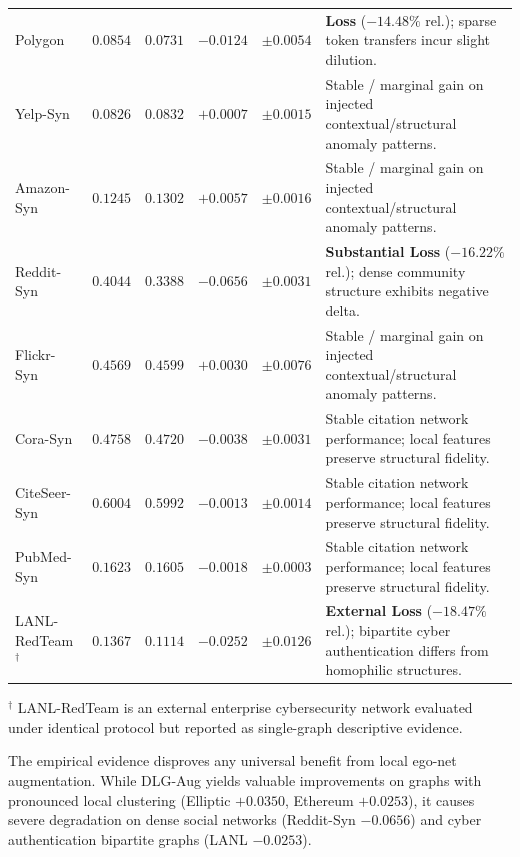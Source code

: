 \documentclass[applsci,article,submit,moreauthors,pdftex]{Definitions/mdpi}
\begin{document}
\begin{table}[htbp]
\begin{tabularx}{\textwidth}{lrrrr>{\raggedright\arraybackslash}X}
Polygon & $0.0854$ & $0.0731$ & $-0.0124$ & $\pm 0.0054$ & \textbf{Loss} ($-14.48\%$ rel.); sparse token transfers incur slight dilution. \\
Yelp-Syn & $0.0826$ & $0.0832$ & $+0.0007$ & $\pm 0.0015$ & Stable / marginal gain on injected contextual/structural anomaly patterns. \\
Amazon-Syn & $0.1245$ & $0.1302$ & $+0.0057$ & $\pm 0.0016$ & Stable / marginal gain on injected contextual/structural anomaly patterns. \\
Reddit-Syn & $0.4044$ & $0.3388$ & $\mathbf{-0.0656}$ & $\pm 0.0031$ & \textbf{Substantial Loss} ($-16.22\%$ rel.); dense community structure exhibits negative delta. \\
Flickr-Syn & $0.4569$ & $0.4599$ & $+0.0030$ & $\pm 0.0076$ & Stable / marginal gain on injected contextual/structural anomaly patterns. \\
Cora-Syn & $0.4758$ & $0.4720$ & $-0.0038$ & $\pm 0.0031$ & Stable citation network performance; local features preserve structural fidelity. \\
CiteSeer-Syn & $0.6004$ & $0.5992$ & $-0.0013$ & $\pm 0.0014$ & Stable citation network performance; local features preserve structural fidelity. \\
PubMed-Syn & $0.1623$ & $0.1605$ & $-0.0018$ & $\pm 0.0003$ & Stable citation network performance; local features preserve structural fidelity. \\
LANL-RedTeam$^{\dagger}$ & $0.1367$ & $0.1114$ & $-0.0252$ & $\pm 0.0126$ & \textbf{External Loss} ($-18.47\%$ rel.); bipartite cyber authentication differs from homophilic structures. \\
\bottomrule
\end{tabularx}
\begin{tablenotes}\footnotesize
\item $^{\dagger}$ LANL-RedTeam is an external enterprise cybersecurity network evaluated under identical protocol but reported as single-graph descriptive evidence.
\end{tablenotes}
\end{table}


The empirical evidence disproves any universal benefit from local ego-net augmentation. While DLG-Aug yields valuable improvements on graphs with pronounced local clustering (Elliptic $+0.0350$, Ethereum $+0.0253$), it causes severe degradation on dense social networks (Reddit-Syn $-0.0656$) and cyber authentication bipartite graphs (LANL $-0.0253$).
\end{document}
